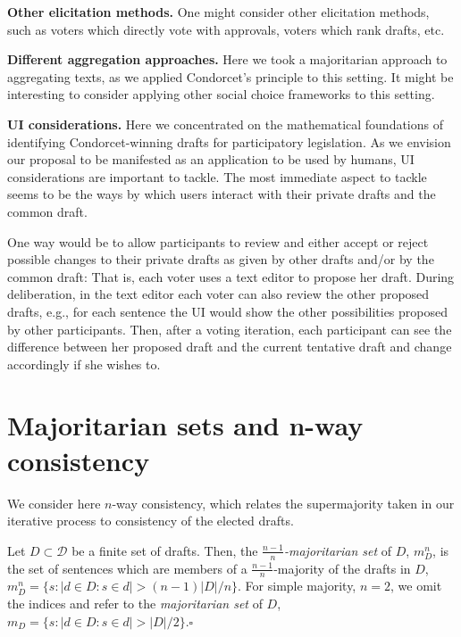 \documentclass[sigconf]{aamas}  %
\newcommand{\mypara}[1]{\smallskip\noindent\textbf{#1.}}
\newcommand{\qqed}{\hfill$\square$}
\newcommand{\calD}{\mathcal{D}}
\begin{document}
\mypara{Other elicitation methods}
%
One might consider other elicitation methods, such as voters which directly vote with approvals, voters which rank drafts, etc.


\mypara{Different aggregation approaches}
%
Here we took a majoritarian approach to aggregating texts, as we applied Condorcet's principle to this setting. It might be interesting to consider applying other social choice frameworks to this setting.

\mypara{UI considerations}
%
Here we concentrated on the mathematical foundations of identifying Condorcet-winning drafts for participatory legislation. As we envision our proposal to be manifested as an application to be used by humans, UI considerations are important to tackle. The most immediate aspect to tackle seems to be the ways by which users interact with their private drafts and the common draft.

One way would be to allow participants to review and either accept or reject possible changes to their private drafts as given by other drafts and/or by the common draft:
  That is, each voter uses a text editor to propose her draft. During deliberation, in the text editor each voter can also review the other proposed drafts, e.g., for each sentence the UI would show the other possibilities proposed by other participants. Then, after a voting iteration, each participant can see the difference between her proposed draft and the current tentative draft and change accordingly if she wishes to.






\appendix


\section{Majoritarian sets and n-way consistency}


We consider here $n$-way consistency, which relates the supermajority taken in our iterative process to consistency of the elected drafts.

\begin{definition}\label{definition:appendix-majoritatian-set}
Let $D \subset \calD$ be a finite set of drafts. Then, the \emph{$\frac{n-1}{n}$-majoritarian set} of $D$, $m^n_D$, is  the set of sentences which are members of a $\frac{n-1}{n}$-majority of the drafts in $D$, $m^n_D = \{s: |d \in D : s \in d| > (n-1)|D|/n\}$.
%
For simple majority, $n=2$, we omit the indices and refer to the \emph{majoritarian set} of $D$, $m_D = \{s: |d \in D : s \in d| > |D|/2\}$.\qqed
%
\end{definition}
\end{document}

